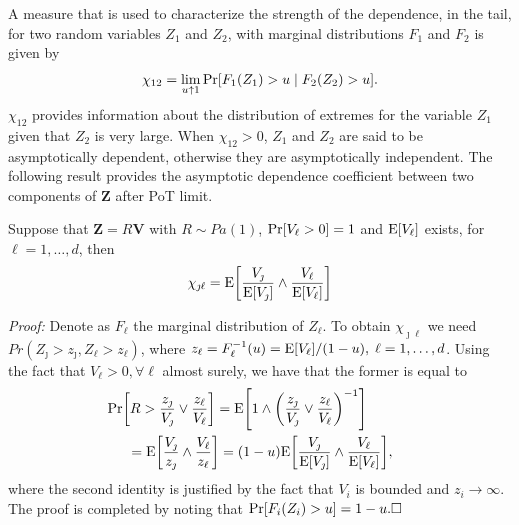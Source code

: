 A measure that is used to characterize the strength of the dependence,
  in the tail, for two random variables $Z_1$ and $Z_2$, with marginal
  distributions $F_1$ and $F_2$ is given by \citep{coles2001}
  \[
    \chi_{12} = \lim\limits_{u\uparrow 1} \prob{F_1(Z_1)>u\mid F_2(Z_2)>u}.   
  \]
  $\chi_{12}$ provides information about the distribution of extremes for the variable $Z_1$
  given that $Z_2$ is very large.  When $\chi_{12}>0$, $Z_1$ and $Z_2$ are said to
  be asymptotically dependent, otherwise they are asymptotically independent. The following result 
  provides the asymptotic dependence coefficient between two components of $\bm{Z}$ after PoT limit.
  \begin{prop}\label{ppchi}
  Suppose that $\bm{Z} = R\bm{V}$ with $R\sim Pa(1)$,
  $\prob{V_\ell > 0} = 1$ and $\expect{V_\ell}$ exists, for $\ell=1, \ldots ,d$, then
    \begin{equation}
    \label{eqn:chi_ij}
	\chi_{\jmath\ell} = \expect{\frac{V_\jmath}{\expect{V_\jmath}} \wedge \frac{V_\ell}{\expect{V_\ell}}}
    \end{equation}
  \end{prop}
  {\em Proof:}
  Denote as $F_\ell$ the marginal distribution of $Z_\ell$. To obtain $\chi_{\jmath\ell}$ we need 
  $Pr(Z_\jmath>z_\jmath,Z_\ell>z_\ell)$, where $z_\ell = F_\ell^{-1}(u) = \expect{V_\ell}/(1 - u), \;\ell=1,\dots, d$.  
  Using the fact that $V_\ell>0, \forall \ell$ almost surely, we have that the former is equal to
  \begin{equation*}
    \begin{aligned}
    &\hspace{-0.5cm}\prob{R>\frac{z_\jmath}{V_\jmath}\vee\frac{z_\ell}{V_\ell}}
    = \expect{1\wedge\left(\frac{z_\jmath}{V_\jmath}\vee\frac{z_\ell}{V_\ell}\right)^{-1}}\\
    &= \expect{\frac{V_\jmath}{z_\jmath}\wedge\frac{V_\ell}{z_\ell}}
    = (1 - u)\expect{\frac{V_\jmath}{\expect{V_\jmath}}\wedge\frac{V_\ell}{\expect{V_\ell}}},
    \end{aligned}
  \end{equation*}
  where the second identity is justified by the fact that $V_i$ is bounded and $z_i\rightarrow\infty$. The 
  proof is completed by noting that $\prob{F_i(Z_i)>u} = 1 - u. \hfill\Box$

